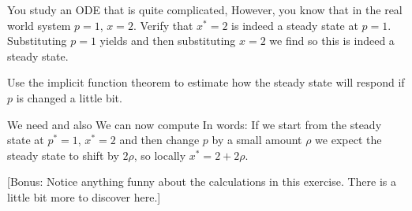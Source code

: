 You study an ODE that is quite complicated,
However, you know that in the real world system $p=1$, $x=2$.  
\subquestion
Verify that $x^*=2$ is indeed a steady state at $p=1$.
\solution
Substituting $p=1$ yields
and then substituting $x=2$ we find
so this is indeed a steady state. 

\subquestion
Use the implicit function theorem to estimate how the steady state will respond if $p$ is changed a little bit. 

\solution
We need 
and also 
We can now compute 
In words: If we start from the steady state at $p^*=1$, $x^*=2$ and then change $p$ by a small amount $\rho$ we expect the steady state to shift by $2\rho$, 
so locally $x^*=2+2\rho$.

[Bonus: Notice anything funny about the calculations in this exercise. There is a little bit more to discover here.]




